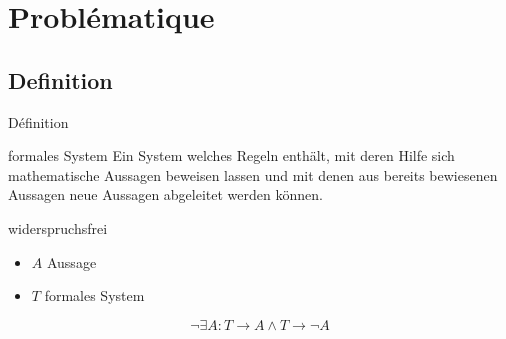\section{Problématique}
\subsection{Definition}
\begin{frame}{Définition}
    \begin{block}{formales System}
        Ein System welches Regeln enthält, mit deren Hilfe sich mathematische Aussagen beweisen lassen und mit denen aus bereits bewiesenen Aussagen neue Aussagen abgeleitet werden können.
    \end{block}
    \begin{block}{widerspruchsfrei}
        \begin{itemize}
            \item $A$ Aussage
            \item $T$ formales System
        \end{itemize}
        $$\neg\exists A: T\rightarrow{}A \wedge T\rightarrow{}\neg{}A $$
    \end{block}
\end{frame}